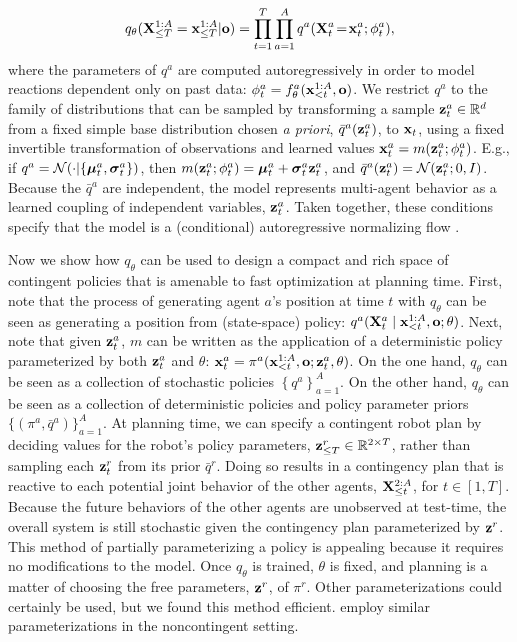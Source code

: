 \documentclass[conference]{IEEEtran}
\begin{document}
\begin{align}
    q_\theta(\mathbf{X}_{\leq T}^{1:A}=\mathbf{x}_{\leq T}^{1:A}|{\mathbf{o}})=\mathop{\prod}_{t=1}^{T}\mathop{\prod}_{a=1}^A  q^a
    (
    \mathbf{X}^a_t\!=\!\mathbf{x}^a_t;\phi_t^a),   \label{eq:esp_model}
    \end{align}
 where the parameters of $q^a$ are computed autoregressively in order to model reactions dependent only on past data: \mbox{$\phi_t^a=f_\theta^a(\mathbf{x}_{<t}^{1:A},\mathbf{o})$}.  We restrict $q^a$ to the family of distributions that can be sampled by transforming a sample $\mathbf{z}_t^a\in\mathbb R^d$ from a fixed simple base distribution chosen \emph{a priori}, $\bar{q}^a(\mathbf{z}_t^a)$, to $\mathbf{x}_t$, using a fixed invertible transformation of observations and learned values \mbox{$\mathbf{x}_t^a=m(\mathbf{z}_t^a; \phi_t^a)$}. E.g., if $q^a=\mathcal N(\cdot| \{\boldsymbol\mu_t^a, \boldsymbol\sigma_t^a\})$, then \mbox{$m(\mathbf{z}_t^a; \phi_t^a)=\boldsymbol\mu_t^a + \boldsymbol\sigma_t^{a}\mathbf{z}_t^a$}, and \mbox{$\bar{q}^a(\mathbf{z}_t^a)=\mathcal N(\mathbf{z}_t^a; 0, I)$}. Because the $\bar{q}^a$ are independent, the model represents multi-agent behavior as a learned coupling of independent variables, $\mathbf{z}_t^a$. Taken together, these conditions specify that the model is a (conditional) autoregressive normalizing flow \cite{dinh2016density,papamakarios2017masked}. 

Now we show how $q_\theta$ can be used to design a compact and rich space of contingent policies that is amenable to fast optimization at planning time. First, note that the process of generating agent $a$'s position at time $t$ with $q_\theta$ can be seen as generating a position from (state-space) policy: \mbox{$q^a(\mathbf{X}_t^a \mid \mathbf{x}_{<t}^{1:A},\mathbf{o}; \theta)$}. Next, note that given $\mathbf{z}_t^a$, $m$ can be written as the application of a deterministic policy parameterized by both $\mathbf{z}_t^a$ and $\theta$: \mbox{$\mathbf{x}_t^a=\pi^a(\mathbf{x}_{<t}^{1:A},\mathbf{o}; \mathbf{z}_t^a, \theta)$}. On the one hand, $q_\theta$ can be seen as a collection of stochastic policies $\left\{q^a\right\}_{a=1}^{A}$. On the other hand, $q_\theta$ can be seen as a collection of deterministic policies and policy parameter priors $\{(\pi^a, \bar{q}^a)\}_{a=1}^{A}$. At planning time, we can specify a contingent robot plan by deciding values for the robot's policy parameters, $\mathbf{z}_{\leq T}^r \in \mathbb R^{2 \times T}$, rather than sampling each $\mathbf{z}_t^r$ from its prior $\bar{q}^r$. Doing so results in a contingency plan that is reactive to each potential joint behavior of the other agents, $\mathbf{X}_{\leq t}^{2:A}$, for $t\in[1,T]$. Because the future behaviors of the other agents are unobserved at test-time, the overall system is still stochastic given the contingency plan parameterized by $\mathbf{z}^r$. This method of partially parameterizing a policy is appealing because it requires no modifications to the model. Once $q_\theta$ is trained, $\theta$ is fixed, and planning is a matter of choosing the free parameters, $\mathbf{z}^r$, of $\pi^r$. Other parameterizations could certainly be used, but we found this method efficient. \cite{rhinehart2020deep,singh2020parrot} employ similar parameterizations in the noncontingent setting.
\end{document}
